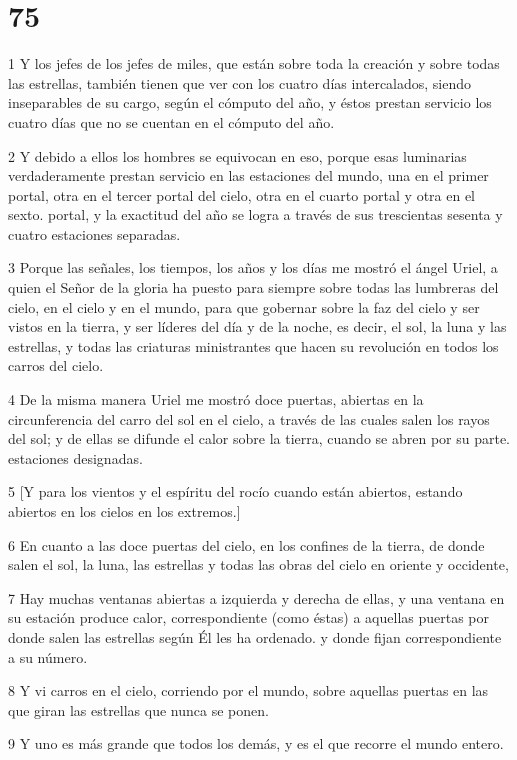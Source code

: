 \chapter{75}

\par 1 Y los jefes de los jefes de miles, que están sobre toda la creación y sobre todas las estrellas, también tienen que ver con los cuatro días intercalados, siendo inseparables de su cargo, según el cómputo del año, y éstos prestan servicio los cuatro días que no se cuentan en el cómputo del año.
\par 2 Y debido a ellos los hombres se equivocan en eso, porque esas luminarias verdaderamente prestan servicio en las estaciones del mundo, una en el primer portal, otra en el tercer portal del cielo, otra en el cuarto portal y otra en el sexto. portal, y la exactitud del año se logra a través de sus trescientas sesenta y cuatro estaciones separadas.
\par 3 Porque las señales, los tiempos, los años y los días me mostró el ángel Uriel, a quien el Señor de la gloria ha puesto para siempre sobre todas las lumbreras del cielo, en el cielo y en el mundo, para que gobernar sobre la faz del cielo y ser vistos en la tierra, y ser líderes del día y de la noche, es decir, el sol, la luna y las estrellas, y todas las criaturas ministrantes que hacen su revolución en todos los carros del cielo.
\par 4 De la misma manera Uriel me mostró doce puertas, abiertas en la circunferencia del carro del sol en el cielo, a través de las cuales salen los rayos del sol; y de ellas se difunde el calor sobre la tierra, cuando se abren por su parte. estaciones designadas.
\par 5 [Y para los vientos y el espíritu del rocío cuando están abiertos, estando abiertos en los cielos en los extremos.]
\par 6 En cuanto a las doce puertas del cielo, en los confines de la tierra, de donde salen el sol, la luna, las estrellas y todas las obras del cielo en oriente y occidente,
\par 7 Hay muchas ventanas abiertas a izquierda y derecha de ellas, y una ventana en su estación produce calor, correspondiente (como éstas) a aquellas puertas por donde salen las estrellas según Él les ha ordenado. y donde fijan correspondiente a su número.
\par 8 Y vi carros en el cielo, corriendo por el mundo, sobre aquellas puertas en las que giran las estrellas que nunca se ponen.
\par 9 Y uno es más grande que todos los demás, y es el que recorre el mundo entero.

